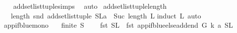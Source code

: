 \begin{isabellebody}
%
\isadelimproof
\ \ %
\endisadelimproof
%
\isatagproof
{}\isamarkupfalse%
\ add{\isacharunderscore}{\kern0pt}set{\isacharunderscore}{\kern0pt}list{\isacharunderscore}{\kern0pt}tuple{\isachardot}{\kern0pt}simps\ \isamarkupfalse%
\ auto%
\endisatagproof
{\isafoldproof}%
%
\isadelimproof
\isanewline
%
\endisadelimproof
\isanewline
{}\isamarkupfalse%
\ add{\isacharunderscore}{\kern0pt}set{\isacharunderscore}{\kern0pt}list{\isacharunderscore}{\kern0pt}tuple{\isacharunderscore}{\kern0pt}length{\isacharcolon}{\kern0pt}\isanewline
\ \ \ {\isachardoublequoteopen}length\ {\isacharparenleft}{\kern0pt}snd\ {\isacharparenleft}{\kern0pt}add{\isacharunderscore}{\kern0pt}set{\isacharunderscore}{\kern0pt}list{\isacharunderscore}{\kern0pt}tuple\ {\isacharparenleft}{\kern0pt}{\isacharparenleft}{\kern0pt}S{\isacharcomma}{\kern0pt}L{\isacharparenright}{\kern0pt}{\isacharcomma}{\kern0pt}a{\isacharparenright}{\kern0pt}{\isacharparenright}{\kern0pt}{\isacharparenright}{\kern0pt}\ {\isacharequal}{\kern0pt}\ Suc\ {\isacharparenleft}{\kern0pt}length\ L{\isacharparenright}{\kern0pt}{\isachardoublequoteclose}\isanewline
%
\isadelimproof
%
\endisadelimproof
%
\isatagproof
{}\isamarkupfalse%
{\isacharparenleft}{\kern0pt}induct\ L{\isacharcomma}{\kern0pt}\ auto{\isacharparenright}{\kern0pt}\ \isamarkupfalse%
%
\endisatagproof
{\isafoldproof}%
%
\isadelimproof
%
\endisadelimproof
%
\isadelimdocument
%
\endisadelimdocument
%
\isatagdocument
%
\isamarkuptrue%
%
\endisatagdocument
{\isafolddocument}%
%
\isadelimdocument
%
\endisadelimdocument
{}\isamarkupfalse%
\ app{\isacharunderscore}{\kern0pt}if{\isacharunderscore}{\kern0pt}blue{\isacharunderscore}{\kern0pt}mono{\isacharcolon}{\kern0pt}\isanewline
\ \ \ {\isachardoublequoteopen}finite\ S{\isachardoublequoteclose}\isanewline
\ \ \ \ {\isachardoublequoteopen}{\isacharparenleft}{\kern0pt}fst\ {\isacharparenleft}{\kern0pt}S{\isacharcomma}{\kern0pt}L{\isacharparenright}{\kern0pt}{\isacharparenright}{\kern0pt}\ {\isasymsubseteq}\ {\isacharparenleft}{\kern0pt}fst\ {\isacharparenleft}{\kern0pt}app{\isacharunderscore}{\kern0pt}if{\isacharunderscore}{\kern0pt}blue{\isacharunderscore}{\kern0pt}else{\isacharunderscore}{\kern0pt}add{\isacharunderscore}{\kern0pt}end\ G\ k\ a\ {\isacharparenleft}{\kern0pt}S{\isacharcomma}{\kern0pt}L{\isacharparenright}{\kern0pt}{\isacharparenright}{\kern0pt}{\isacharparenright}{\kern0pt}{\isachardoublequoteclose}\isanewline

\end{isabellebody}
